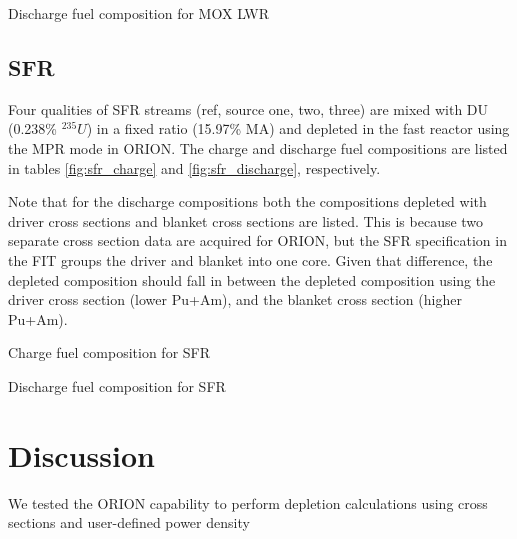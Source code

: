 \documentclass{article}
\begin{document}
\begin{table}[h]
    \centering
    
    \caption{Discharge fuel composition for \gls{MOX} \gls{LWR}}
    \label{fig:lwr_discharge}
\end{table}

\FloatBarrier

\subsection{\gls{SFR}}
Four qualities of \gls{SFR} streams (ref, source one, two, three) are mixed with
\gls{DU} (0.238\% $^{235}U$) in a fixed ratio (15.97\% \gls{MA}) and depleted in the 
fast reactor using the MPR mode in ORION. The charge and discharge fuel compositions are 
listed in tables \ref{fig:sfr_charge} and \ref{fig:sfr_discharge}, respectively.

Note that for the discharge compositions both the compositions depleted with driver
cross sections and blanket cross sections are listed. This is because two separate
cross section data are acquired for ORION, but the \gls{SFR} specification in the
FIT groups the driver and blanket into one core. Given that difference, the depleted
composition should fall in between the depleted composition using the driver cross section (lower Pu+Am),
and the blanket cross section (higher Pu+Am).

\begin{table}[h]
    \centering
    
    \caption{Charge fuel composition for \gls{SFR}}
    \label{fig:sfr_charge}
\end{table}

\begin{table}[h]
    \centering
    \resizebox{\textwidth}{!}{
    }
    \caption{Discharge fuel composition for \gls{SFR}}
    \label{fig:sfr_discharge}
\end{table}

\FloatBarrier

\section{Discussion}
We tested the ORION capability to perform depletion calculations
using cross sections and user-defined power density



\end{document}
